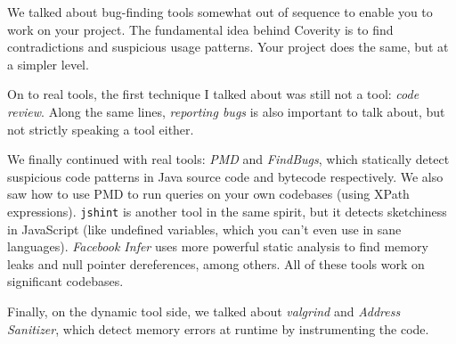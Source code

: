 \documentclass[11pt]{article}
\begin{document}
We talked about bug-finding tools somewhat out of sequence to enable
you to work on your project.  The fundamental idea behind Coverity is
to find contradictions and suspicious usage patterns. Your project
does the same, but at a simpler level.

On to real tools, the first technique I talked about was still not a tool:
\emph{code review}. Along the same lines, \emph{reporting bugs} is also important
to talk about, but not strictly speaking a tool either.

We finally continued with real tools: \emph{PMD} and \emph{FindBugs},
which statically detect suspicious code patterns in Java source code
and bytecode respectively. We also saw how to use PMD to run queries
on your own codebases (using XPath expressions). {\tt jshint} is another
tool in the same spirit, but it detects sketchiness in JavaScript
(like undefined variables, which you can't even use in sane languages).
\emph{Facebook Infer} uses more powerful static analysis to find memory
leaks and null pointer dereferences, among others. All of these tools
work on significant codebases.

Finally, on the dynamic tool side, we talked about \emph{valgrind}
and \emph{Address Sanitizer}, which detect memory errors at runtime
by instrumenting the code.
\end{document}
